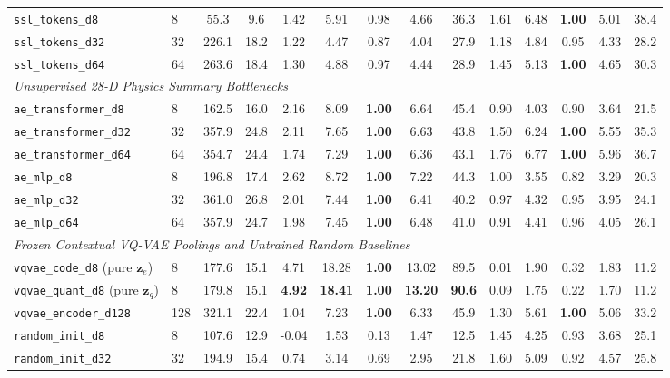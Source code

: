 \documentclass{article}
\begin{document}
\begin{table}[htbp]
{\begin{tabular}{llcc|ccccc|ccccc}
\texttt{ssl\_tokens\_d8} & 8 & 55.3 & 9.6 & 1.42 & 5.91 & 0.98 & 4.66 & 36.3 & 1.61 & 6.48 & \textbf{1.00} & 5.01 & 38.4 \\
\texttt{ssl\_tokens\_d32} & 32 & 226.1 & 18.2 & 1.22 & 4.47 & 0.87 & 4.04 & 27.9 & 1.18 & 4.84 & 0.95 & 4.33 & 28.2 \\
\texttt{ssl\_tokens\_d64} & 64 & 263.6 & 18.4 & 1.30 & 4.88 & 0.97 & 4.44 & 28.9 & 1.45 & 5.13 & \textbf{1.00} & 4.65 & 30.3 \\
\midrule
\multicolumn{14}{l}{\textit{Unsupervised 28-D Physics Summary Bottlenecks}} \\
\texttt{ae\_transformer\_d8} & 8 & 162.5 & 16.0 & 2.16 & 8.09 & \textbf{1.00} & 6.64 & 45.4 & 0.90 & 4.03 & 0.90 & 3.64 & 21.5 \\
\texttt{ae\_transformer\_d32} & 32 & 357.9 & 24.8 & 2.11 & 7.65 & \textbf{1.00} & 6.63 & 43.8 & 1.50 & 6.24 & \textbf{1.00} & 5.55 & 35.3 \\
\texttt{ae\_transformer\_d64} & 64 & 354.7 & 24.4 & 1.74 & 7.29 & \textbf{1.00} & 6.36 & 43.1 & 1.76 & 6.77 & \textbf{1.00} & 5.96 & 36.7 \\
\texttt{ae\_mlp\_d8} & 8 & 196.8 & 17.4 & 2.62 & 8.72 & \textbf{1.00} & 7.22 & 44.3 & 1.00 & 3.55 & 0.82 & 3.29 & 20.3 \\
\texttt{ae\_mlp\_d32} & 32 & 361.0 & 26.8 & 2.01 & 7.44 & \textbf{1.00} & 6.41 & 40.2 & 0.97 & 4.32 & 0.95 & 3.95 & 24.1 \\
\texttt{ae\_mlp\_d64} & 64 & 357.9 & 24.7 & 1.98 & 7.45 & \textbf{1.00} & 6.48 & 41.0 & 0.91 & 4.41 & 0.96 & 4.05 & 26.1 \\
\midrule
\multicolumn{14}{l}{\textit{Frozen Contextual VQ-VAE Poolings and Untrained Random Baselines}} \\
\texttt{vqvae\_code\_d8} (pure $\mathbf{z}_e$) & 8 & 177.6 & 15.1 & 4.71 & 18.28 & \textbf{1.00} & 13.02 & 89.5 & 0.01 & 1.90 & 0.32 & 1.83 & 11.2 \\
\texttt{vqvae\_quant\_d8} (pure $\mathbf{z}_q$) & 8 & 179.8 & 15.1 & \textbf{4.92} & \textbf{18.41} & \textbf{1.00} & \textbf{13.20} & \textbf{90.6} & 0.09 & 1.75 & 0.22 & 1.70 & 11.2 \\
\texttt{vqvae\_encoder\_d128} & 128 & 321.1 & 22.4 & 1.04 & 7.23 & \textbf{1.00} & 6.33 & 45.9 & 1.30 & 5.61 & \textbf{1.00} & 5.06 & 33.2 \\
\texttt{random\_init\_d8} & 8 & 107.6 & 12.9 & -0.04 & 1.53 & 0.13 & 1.47 & 12.5 & 1.45 & 4.25 & 0.93 & 3.68 & 25.1 \\
\texttt{random\_init\_d32} & 32 & 194.9 & 15.4 & 0.74 & 3.14 & 0.69 & 2.95 & 21.8 & 1.60 & 5.09 & 0.92 & 4.57 & 25.8 \\

\end{tabular}}
\end{table}
\end{document}
